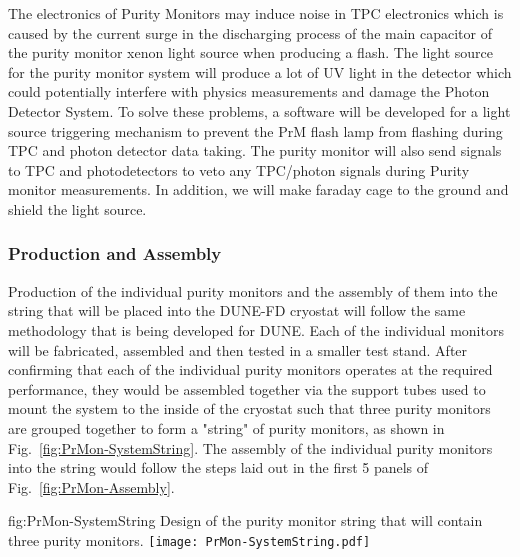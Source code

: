 The electronics of Purity Monitors may induce noise in TPC electronics which is caused by the current surge in the discharging process of the main capacitor of the purity monitor xenon light source when producing a flash.  The light source for the purity monitor system will produce a lot of UV light in the detector which could potentially interfere with physics measurements and damage the Photon Detector System. To solve these problems, a software will be developed for a light source triggering mechanism to prevent the PrM flash lamp from flashing during TPC and photon detector data taking. The purity monitor will also send signals to TPC and photodetectors to veto any TPC/photon signals during Purity monitor measurements. In addition, we will make faraday cage to the ground and shield the light source.



\subsubsection{Production and Assembly}
\label{sec:PrMon-Production-Assembly}
Production of the individual purity monitors and the assembly of them into the string that will be placed into the DUNE-FD cryostat will follow the same methodology that is being developed for DUNE.  Each of the individual monitors will be fabricated, assembled and then tested in a smaller test stand.  After confirming that each of the individual purity monitors operates at the required performance, they would be assembled together via the support tubes used to mount the system to the inside of the cryostat such that three purity monitors are grouped together to form a "string" of purity monitors, as shown in Fig.~\ref{fig:PrMon-SystemString}.  The assembly of the individual purity monitors into the string would follow the steps laid out in the first 5 panels of Fig.~\ref{fig:PrMon-Assembly}.  

\begin{dunefigure}{fig:PrMon-SystemString}
  {Design of the purity monitor string that will contain three purity monitors.}
  \texttt{[image: PrMon-SystemString.pdf]}
\end{dunefigure}

